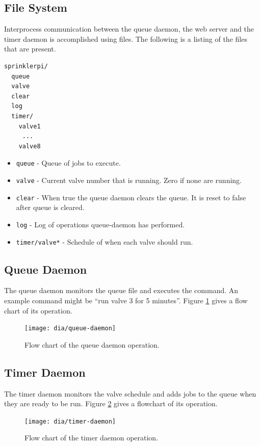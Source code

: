 \documentclass{article}
\begin{document}
\FloatBarrier
\subsection{File System}

Interprocess communication between the queue daemon, the web server
and the timer daemon is accomplished using files.
The following is a listing of the files that are present.

\begin{verbatim}
sprinklerpi/
  queue
  valve
  clear
  log
  timer/
    valve1
     ...
    valve8
\end{verbatim}

\begin{itemize}
    \item \verb+queue+ - Queue of jobs to execute.
    \item \verb+valve+ - Current valve number that is running.
        Zero if none are running.
    \item \verb+clear+ - When true the queue daemon clears the queue.
        It is reset to false after queue is cleared.
    \item \verb+log+ - Log of operations queue-daemon has performed.
    \item \verb+timer/valve*+ - Schedule of when each valve should run.
\end{itemize}

\FloatBarrier
\subsection{Queue Daemon}

The queue daemon monitors the queue file and executes the command.
An example command might be ``run valve 3 for 5 minutes''.
Figure \ref{fig:queue-daemon} gives a flow chart of its operation.

\begin{figure}[htbp!]
\begin{center}
\texttt{[image: dia/queue-daemon]}
\end{center}
\caption{Flow chart of the queue daemon operation.}
\label{fig:queue-daemon}
\end{figure}


\clearpage
\FloatBarrier
\subsection{Timer Daemon}

The timer daemon monitors the valve schedule and adds jobs
to the queue when they are ready to be run.
Figure \ref{fig:timer-daemon} gives a flowchart of its operation.

\begin{figure}[htbp!]
\begin{center}
\texttt{[image: dia/timer-daemon]}
\end{center}
\caption{Flow chart of the timer daemon operation.}
\label{fig:timer-daemon}
\end{figure}


\pagebreak
\glsaddall
\printglossaries

\clearpage
\printbibliography[heading=bibintoc]
\end{document}
